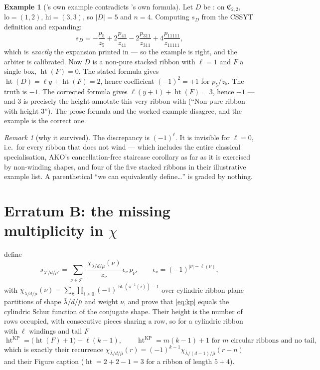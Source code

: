 \documentclass[11pt]{article}
\theoremstyle{plain}
\theoremstyle{definition}
\newtheorem{example}[theorem]{Example}
\theoremstyle{remark}
\newtheorem{remark}[theorem]{Remark}
\DeclareMathOperator{\hgt}{ht}
\newcommand{\CC}{\mathfrak{C}}
\newcommand{\bl}{\bar\lambda}
\newcommand{\bm}{\bar\mu}
\begin{document}
\begin{example}[\cite{AKO}'s own example contradicts \cite{AKO}'s own formula]\label{ex:ako}
Let $D$ be \cite[\texttt{ex:mnrule}]{AKO}: on $\CC_{2,2}$, $\mathrm{lo}=(1,2)$, $\mathrm{hi}=(3,3)$,
so $|D|=5$ and $n=4$. Computing $s_D$ from the CSSYT definition and expanding:
\[
  s_D=-\frac{p_5}{z_5}+2\frac{p_{41}}{z_{41}}-2\frac{p_{311}}{z_{311}}+4\frac{p_{11111}}{z_{11111}},
\]
which is \emph{exactly} the expansion printed in \cite{AKO} --- so the example is right, and the
arbiter is calibrated. Now $D$ is a non-pure stacked ribbon with $\ell=1$ and $F$ a single box,
$\hgt(F)=0$. The stated formula gives $\hgt(D)=\ell y+\hgt(F)=2$, hence coefficient $(-1)^2=+1$ for
$p_5/z_5$. The truth is $-1$. The corrected formula gives $\ell(y+1)+\hgt(F)=3$, hence $-1$ ---
and $3$ is precisely the height \cite{AKO} annotate this very ribbon with (``Non-pure ribbon with
height 3''). The prose formula and the worked example disagree, and the example is the correct one.
\end{example}

\begin{remark}[why it survived]
The discrepancy is $(-1)^\ell$. It is invisible for $\ell=0$, i.e.\ for every ribbon that does not
wind --- which includes the entire classical specialisation, AKO's cancellation-free staircase
corollary as far as it is exercised by non-winding shapes, and four of the five stacked ribbons in
their illustrative example list. A parenthetical ``we can equivalently define\dots'' is graded by
nothing.
\end{remark}

\section{Erratum B: the missing multiplicity in \texorpdfstring{$\chi$}{chi}}

\cite[\texttt{\eqref{cylSchur}}]{KP} define
\begin{equation}\label{eq:kp}
  s_{\bl'/d/\bm'}=\sum_{\nu\in\mathcal{P}^+}\frac{\chi_{\bl/d/\bm}(\nu)}{z_\nu}\,\epsilon_\nu\,p_\nu,
  \qquad \epsilon_\nu=(-1)^{|\nu|-\ell(\nu)},
\end{equation}
with $\chi_{\bl/d/\bm}(\nu)=\sum_{\bar\pi}\prod_{i\ge0}(-1)^{\hgt(\bar\pi^{-1}(i))-1}$ over cylindric
ribbon plane partitions of shape $\bl/d/\bm$ and weight $\nu$, and prove that \eqref{eq:kp} equals the
cylindric Schur function of the conjugate shape. Their height is the number of rows occupied, with
consecutive pieces sharing a row, so for a cylindric ribbon with $\ell$ windings and tail $F$
\begin{equation}\label{eq:kpht}
  \hgt^{\mathrm{KP}}=\bigl(\hgt(F)+1\bigr)+\ell(k-1),\qquad
  \hgt^{\mathrm{KP}}=m(k-1)+1 \text{ for } m \text{ circular ribbons and no tail,}
\end{equation}
which is exactly their recurrence $\chi_{\bl/d/\bm}(r)=(-1)^{k-1}\chi_{\bl/(d-1)/\bm}(r-n)$ and their
Figure caption ($\hgt=2+2-1=3$ for a ribbon of length $5+4$).
\end{document}
